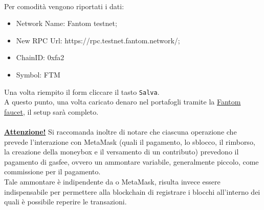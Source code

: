 \textbf{}\\
Per comodità vengono riportati i dati:
\begin{itemize}
    \item Network Name: Fantom testnet;
    \item New RPC Url: https://rpc.testnet.fantom.network/;
    \item ChainID: 0xfa2
    \item Symbol: FTM
\end{itemize}
Una volta riempito il form cliccare il tasto \texttt{Salva}.\\
A questo punto, una volta caricato denaro nel portafogli tramite la \href{https://faucet.fantom.network/}{Fantom faucet}, il setup sarà completo.\\\\
\underline{\textbf{Attenzione!}} Si raccomanda inoltre di notare che ciascuna operazione che prevede l'interazione con MetaMask (quali il pagamento, lo sblocco, il rimborso, la creazione della moneybox e il versamento di un contributo) prevedono il pagamento di gasfee, ovvero un ammontare variabile, generalmente piccolo, come commissione per il pagamento.\\
Tale ammontare è indipendente da \projectName{} o MetaMask, risulta invece essere indispensabile per permettere alla blockchain\glo{} di registrare i blocchi all'interno dei quali è possibile reperire le transazioni.